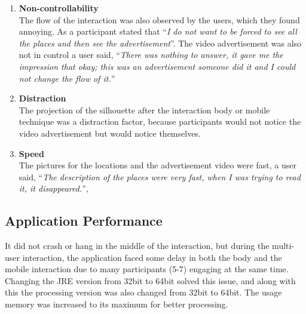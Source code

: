 \begin{itemize}
\begin{enumerate}
\item	\textbf{Non-controllability}\\
The flow of the interaction was also observed by the users, which they found annoying. As a participant stated that ``\emph{I do not want to be forced to see all the places and then see the advertisement}''. The video advertisement was also not in control a user said, ``\emph{There was nothing to answer, it gave me the impression that okay; this was an advertisement someone did it and I could not change the flow of it.}'' 

\item	\textbf{Distraction}\\
The projection of the silhouette after the interaction body or mobile technique was a distraction factor, because participants would not notice the video advertisement but would notice themselves. 

\item	\textbf{Speed}\\
The pictures for the locations and the advertisement video were fast, a user said, ``\emph{The description of the places were very fast, when I was trying to read it, it disappeared.}'', 
\end{enumerate}

\end{itemize}


\subsection{Application Performance}
It did not crash or hang in the middle of the interaction, but during the multi-user interaction, the application faced some delay in both the body and the mobile interaction due to many participants (5-7) engaging at the same time. Changing the JRE version from 32bit to 64bit solved this issue, and along with this the processing version was also changed from 32bit to 64bit. The usage memory was increased to its maximum for better processing.

